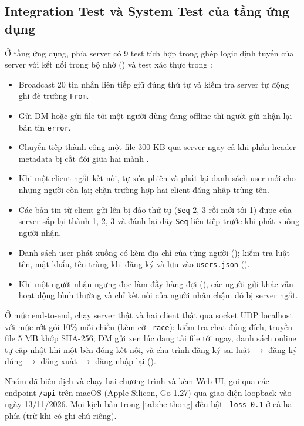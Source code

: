 \subsection{Integration Test và System Test của tầng ứng dụng}
\label{subsec:test-he-thong}
Ở tầng ứng dụng, phía server có 9 test tích hợp trong  ghép logic định tuyến
của server với kết nối trong bộ nhớ () và test xác thực trong :
\begin{itemize}
  \item Broadcast 20 tin nhắn liên tiếp giữ đúng thứ tự và kiểm tra server tự động ghi đè trường \texttt{From}.
  \item Gửi DM hoặc gửi file tới một người dùng đang offline thì người gửi nhận lại bản tin \texttt{error}.
  \item Chuyển tiếp thành công một file 300 KB qua server ngay cả khi phần header metadata bị cắt đôi giữa hai
        mảnh .
  \item Khi một client ngắt kết nối,  tự xóa phiên và phát lại danh sách user mới cho những người
        còn lại; chặn trường hợp hai client đăng nhập trùng tên.
  \item Các bản tin từ client gửi lên bị đảo thứ tự (\texttt{Seq} 2, 3 rồi mới tới 1) được  của
        server sắp lại thành 1, 2, 3 và đánh lại dãy \texttt{Seq} liên tiếp trước khi phát xuống người nhận.
  \item Danh sách user phát xuống có kèm địa chỉ của từng người (); kiểm tra luật tên,
        mật khẩu, tên trùng khi đăng ký và lưu vào \texttt{users.json} ().
  \item Khi một người nhận ngưng đọc làm đầy hàng đợi (), các người gửi khác
        vẫn hoạt động bình thường và chỉ kết nối của người nhận chậm đó bị server ngắt.
\end{itemize}
Ở mức end-to-end,  chạy server thật và hai client thật qua socket UDP localhost
với mức rớt gói 10\% mỗi chiều (kèm cờ \texttt{-race}): kiểm tra chat đúng đích, truyền file 5 MB khớp SHA-256, DM
gửi xen lúc đang tải file tới ngay, danh sách online tự cập nhật khi một bên đóng kết nối, và chu trình đăng ký sai
luật $\to$ đăng ký đúng $\to$ đăng xuất $\to$ đăng nhập lại ().

Nhóm đã biên dịch và chạy hai chương trình  và  kèm Web UI, gọi qua
các endpoint \texttt{/api} trên macOS (Apple Silicon, Go 1.27) qua giao diện loopback vào ngày 13/11/2026. Mọi kịch
bản trong \cref{tab:he-thong} đều bật \texttt{-loss 0.1} ở cả hai phía (trừ khi có ghi chú riêng).

